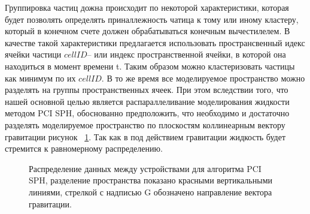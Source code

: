 Группировка частиц дожна происходит по некоторой характеристики, которая будет позволять определять приналлежность чатица к тому или иному кластеру, который в конечном счете должен обрабатываться конечным вычестилелем. В качестве такой характеристики предлагается использовать пространсвенный идекс ячейки частици \(cellID\)– или индекс пространственной ячейки, в которой она находиться в момент времени t. Таким образом можно кластеризовать частицы как минимум по их \(cellID\). В то же время все моделируемое пространство можно разделять на группы пространственных ячеек. При этом вследствии  того, что нашей основной целью является распараллеливание моделирования жидкости методом PCI SPH, обоснованно предположить, что необходимо и достаточно разделять моделируемое пространство по плоскостям коллинеарным вектору гравитации рисунок ~\ref{fig:dstr_1}. Так как в под действием гравитации жидкость будет стремится к равномерному распределению.
\begin{figure}[ht]
  \caption{Распределение данных между устройствами для алгоритма PCI SPH, разделение пространства показано красными вертикальными линиями, стрелкой с надписью G обозначено направление вектора гравитации.}
  \label{fig:dstr_1}
\end{figure}

